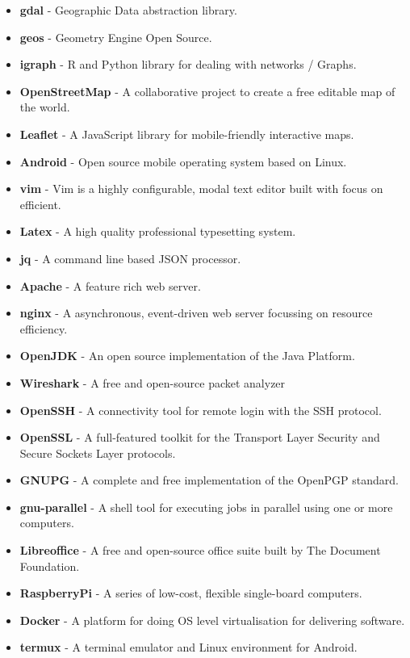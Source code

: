 \begin{itemize}
  \item \textbf{gdal} - Geographic Data abstraction library.
  \item \textbf{geos} - Geometry Engine Open Source.
  \item \textbf{igraph} - R and Python library for dealing with networks / Graphs.
  \item \textbf{OpenStreetMap} - A collaborative project to create a free editable map of the world.
  \item \textbf{Leaflet} - A JavaScript library for mobile-friendly interactive maps.
  \item \textbf{Android } - Open source mobile operating system based on Linux.
  \item \textbf{vim} - Vim is a highly configurable, modal text editor built with focus on efficient.
  \item \textbf{Latex} - A high quality professional typesetting system.
  \item \textbf{jq} - A command line based JSON processor.
  \item \textbf{Apache} - A feature rich web server.
  \item \textbf{nginx} - A asynchronous, event-driven web server focussing on resource efficiency.
  \item \textbf{OpenJDK} - An open source implementation of the Java Platform.
  \item \textbf{Wireshark} - A free and open-source packet analyzer
  \item \textbf{OpenSSH} - A connectivity tool for remote login with the SSH protocol.
  \item \textbf{OpenSSL} - A full-featured toolkit for the Transport Layer Security and Secure Sockets Layer protocols.
  \item \textbf{GNUPG} - A complete and free implementation of the OpenPGP standard.
  \item \textbf{gnu-parallel} - A shell tool for executing jobs in parallel using one or more computers.
  \item \textbf{Libreoffice} - A free and open-source office suite built by The Document Foundation.
  \item \textbf{RaspberryPi} - A series of low-cost, flexible single-board computers.
  \item \textbf{Docker} - A platform for doing OS level virtualisation for delivering software.
  \item \textbf{termux} - A terminal emulator and Linux environment for Android.
\end{itemize}

% 
